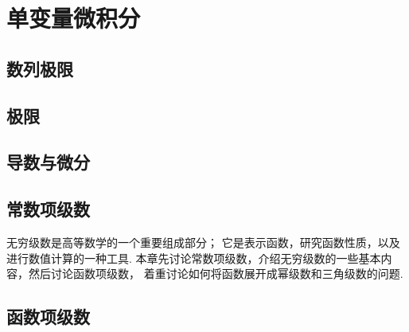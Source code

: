 \part{单变量微积分}


\chapter{数列极限}


\chapter{极限}
















\chapter{导数与微分}\label{chapter:导数}









\chapter{常数项级数}
无穷级数是高等数学的一个重要组成部分；
它是表示函数，研究函数性质，以及进行数值计算的一种工具.
本章先讨论常数项级数，介绍无穷级数的一些基本内容，然后讨论函数项级数，
着重讨论如何将函数展开成幂级数和三角级数的问题.




\chapter{函数项级数}











